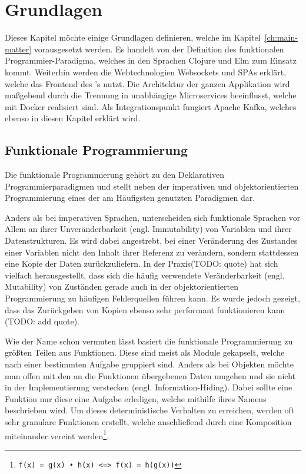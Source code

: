 \chapter{Grundlagen}
\label{ch:fundamentals}

Dieses Kapitel möchte einige Grundlagen definieren, welche im Kapitel~\ref{ch:main-matter} vorausgesetzt werden.
Es handelt von der Definition des funktionalen Programmier-Paradigma, welches in den Sprachen Clojure und Elm zum Einsatz kommt.
Weiterhin werden die Webtechnologien Websockets und \acp{SPA} erklärt, welche das Frontend des 's nutzt. 
Die Architektur der ganzen Applikation wird maßgebend durch die Trennung in unabhängige Microservices beeinflusst, welche mit Docker realisiert sind.
Als Integrationspunkt fungiert Apache Kafka, welches ebenso in diesen Kapitel erklärt wird.
\section{Funktionale Programmierung}
Die funktionale Programmierung gehört zu den Deklarativen Programmierparadigmen und stellt neben der imperativen und objektorientierten Programmierung eines der am Häufigsten genutzten Paradigmen dar.
\par
Anders als bei imperativen Sprachen, unterscheiden sich funktionale Sprachen vor Allem an ihrer Unveränderbarkeit (engl. Immutability) von Variablen und ihrer Datenstrukturen.
Es wird dabei angestrebt, bei einer Veränderung des Zustandes einer Variablen nicht den Inhalt ihrer Referenz zu verändern, sondern stattdessen eine Kopie der Daten zurückzuliefern.
In der Praxis(TODO: quote) hat sich vielfach herausgestellt, dass sich die häufig verwendete Veränderbarkeit (engl. Mutability) von Zuständen gerade auch in der objektorientierten Programmierung zu häufigen Fehlerquellen führen kann.
Es wurde jedoch gezeigt, dass das Zurückgeben von Kopien ebenso sehr performant funktionieren kann (TODO: add quote).
\par
Wie der Name schon vermuten lässt basiert die funktionale Programmierung zu größten Teilen aus Funktionen. 
Diese sind meist als Module gekapselt, welche nach einer bestimmten Aufgabe gruppiert sind. 
Anders als bei Objekten möchte man offen mit den an die Funktionen übergebenen Daten umgehen und sie nicht in der Implementierung verstecken (engl. Information-Hiding). 
Dabei sollte eine Funktion nur diese eine Aufgabe erledigen, welche mithilfe ihres Namens beschrieben wird. 
Um dieses deterministische Verhalten zu erreichen, werden oft sehr granulare Funktionen erstellt, welche anschließend durch eine Komposition miteinander vereint werden\footnote{\texttt{f(x) = g(x) • h(x) <=> f(x) = h(g(x))}}.
